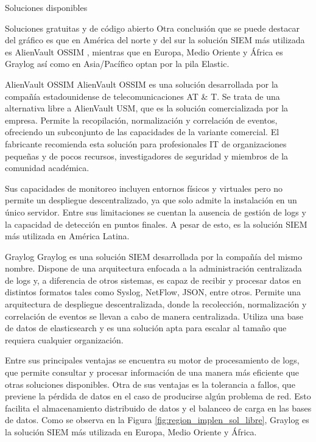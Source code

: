 \begin{section}{Soluciones disponibles}
\begin{subsection}{Soluciones gratuitas y de código abierto}
        Otra conclusión que se puede destacar del gráfico es que en América del norte y del sur la solución SIEM más utilizada es AlienVault OSSIM \cite{alienvault_ossim}, mientras que en Europa, Medio Oriente y África es Graylog \cite{graylog} así como en Asia/Pacífico optan por la pila Elastic\cite{elastic}.\par
        
            \begin{subsubsection}{AlienVault OSSIM}
            AlienVault OSSIM \cite{alienvault_ossim} es una solución desarrollada por la compañía estadounidense de telecomunicaciones AT \& T. Se trata de una alternativa libre a AlienVault USM, que es la solución comercializada por la empresa. Permite la recopilación, normalización y correlación de eventos, ofreciendo un subconjunto de las capacidades de la variante comercial. El fabricante recomienda esta solución para profesionales IT de organizaciones pequeñas y de pocos recursos, investigadores de seguridad y miembros de la comunidad académica. \par
            Sus capacidades de monitoreo incluyen entornos físicos y virtuales pero no permite un despliegue descentralizado, ya que solo admite la instalación en un único servidor. Entre sus limitaciones se cuentan la ausencia de gestión de logs y la capacidad de detección en puntos finales. A pesar de esto, es la solución SIEM más utilizada en América Latina.

            \end{subsubsection}
            \begin{subsubsection}{Graylog}
            Graylog \cite{graylog} es una solución SIEM desarrollada por la compañía del mismo nombre. Dispone de una arquitectura enfocada a la administración centralizada de logs y, a diferencia de otros sistemas, es capaz de recibir y procesar datos en distintos formatos tales como Syslog, NetFlow, JSON, entre otros. Permite una arquitectura de despliegue descentralizada, donde la recolección, normalización y correlación de eventos se llevan a cabo de manera centralizada. Utiliza una base de datos de elasticsearch y es una solución apta para escalar al tamaño que requiera cualquier organización. \par 
            Entre sus principales ventajas se encuentra su motor de procesamiento de logs, que permite consultar y procesar información de una manera más eficiente que otras soluciones disponibles. Otra de sus ventajas es la tolerancia a fallos, que previene la pérdida de datos en el caso de producirse algún problema de red. Esto facilita el almacenamiento distribuido de datos y el balanceo de carga en las bases de datos. Como se observa en la Figura \ref{fig:region_implen_sol_libre}, Graylog es la solución SIEM más utilizada en Europa, Medio Oriente y África.


\end{subsubsection}
\end{subsection}
\end{section}
